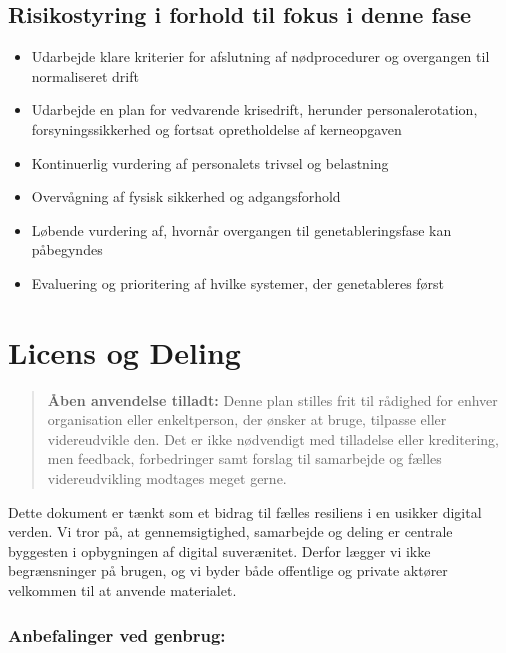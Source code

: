 \documentclass[a4paper,11pt]{book}
\begin{document}
\section{Risikostyring i forhold til fokus i denne
fase}\label{risikostyring-i-forhold-til-fokus-i-denne-fase}

\begin{itemize}
\tightlist
\item
  Udarbejde klare kriterier for afslutning af nødprocedurer og
  overgangen til normaliseret drift
\item
  Udarbejde en plan for vedvarende krisedrift, herunder
  personalerotation, forsyningssikkerhed og fortsat opretholdelse af
  kerneopgaven
\item
  Kontinuerlig vurdering af personalets trivsel og belastning
\item
  Overvågning af fysisk sikkerhed og adgangsforhold
\item
  Løbende vurdering af, hvornår overgangen til genetableringsfase kan
  påbegyndes
\item
  Evaluering og prioritering af hvilke systemer, der genetableres først
\end{itemize}

\newpage

\chapter{Licens og Deling}\label{licens-og-deling}

\begin{quote}
\textbf{Åben anvendelse tilladt:} Denne plan stilles frit til rådighed
for enhver organisation eller enkeltperson, der ønsker at bruge,
tilpasse eller videreudvikle den. Det er ikke nødvendigt med tilladelse
eller kreditering, men feedback, forbedringer samt forslag til
samarbejde og fælles videreudvikling modtages meget gerne.
\end{quote}

Dette dokument er tænkt som et bidrag til fælles resiliens i en usikker
digital verden. Vi tror på, at gennemsigtighed, samarbejde og deling er
centrale byggesten i opbygningen af digital suverænitet. Derfor lægger
vi ikke begrænsninger på brugen, og vi byder både offentlige og private
aktører velkommen til at anvende materialet.

\subsection{Anbefalinger ved genbrug:}\label{anbefalinger-ved-genbrug}
\end{document}
